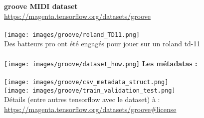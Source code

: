 \textbf{groove MIDI dataset}\\
	\url{https://magenta.tensorflow.org/datasets/groove}\\\\
	\texttt{[image: images/groove/roland\_TD11.png]}\\
	Des batteurs pro ont été engagés pour jouer sur un roland td-11\\\\
	\texttt{[image: images/groove/dataset\_how.png]}\newpage{}
	\textbf{Les métadatas :}\\\\
	\texttt{[image: images/groove/csv\_metadata\_struct.png]}\\
	\texttt{[image: images/groove/train\_validation\_test.png]}\\
	Détails (entre autres tensorflow avec le dataset) à :
	\url{https://magenta.tensorflow.org/datasets/groove#license}\\
	\newpage